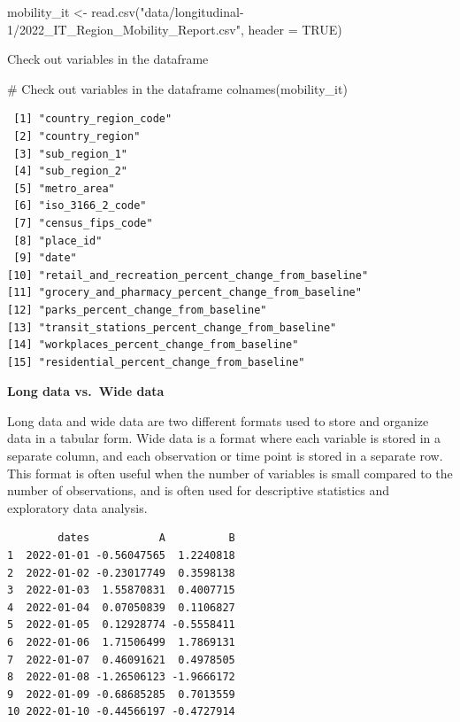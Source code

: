 \documentclass[
  letterpaper,
  DIV=11,
  numbers=noendperiod]{scrreprt}
\newenvironment{Shaded}{\begin{snugshade}}{\end{snugshade}}
\newcommand{\AttributeTok}[1]{\textcolor[rgb]{0.40,0.45,0.13}{#1}}
\newcommand{\CommentTok}[1]{\textcolor[rgb]{0.37,0.37,0.37}{#1}}
\newcommand{\ConstantTok}[1]{\textcolor[rgb]{0.56,0.35,0.01}{#1}}
\newcommand{\FunctionTok}[1]{\textcolor[rgb]{0.28,0.35,0.67}{#1}}
\newcommand{\NormalTok}[1]{\textcolor[rgb]{0.00,0.23,0.31}{#1}}
\newcommand{\OtherTok}[1]{\textcolor[rgb]{0.00,0.23,0.31}{#1}}
\newcommand{\StringTok}[1]{\textcolor[rgb]{0.13,0.47,0.30}{#1}}
\begin{document}
\begin{Shaded}
\begin{Highlighting}[]
\NormalTok{mobility\_it }\OtherTok{\textless{}{-}} \FunctionTok{read.csv}\NormalTok{(}\StringTok{"data/longitudinal{-}1/2022\_IT\_Region\_Mobility\_Report.csv"}\NormalTok{, }\AttributeTok{header =} \ConstantTok{TRUE}\NormalTok{)}
\end{Highlighting}
\end{Shaded}

Check out variables in the dataframe

\begin{Shaded}
\begin{Highlighting}[]
\CommentTok{\# Check out variables in the dataframe }
\FunctionTok{colnames}\NormalTok{(mobility\_it)}
\end{Highlighting}
\end{Shaded}

\begin{verbatim}
 [1] "country_region_code"                               
 [2] "country_region"                                    
 [3] "sub_region_1"                                      
 [4] "sub_region_2"                                      
 [5] "metro_area"                                        
 [6] "iso_3166_2_code"                                   
 [7] "census_fips_code"                                  
 [8] "place_id"                                          
 [9] "date"                                              
[10] "retail_and_recreation_percent_change_from_baseline"
[11] "grocery_and_pharmacy_percent_change_from_baseline" 
[12] "parks_percent_change_from_baseline"                
[13] "transit_stations_percent_change_from_baseline"     
[14] "workplaces_percent_change_from_baseline"           
[15] "residential_percent_change_from_baseline"          
\end{verbatim}

\textbf{Long data vs.~Wide data}

Long data and wide data are two different formats used to store and
organize data in a tabular form. Wide data is a format where each
variable is stored in a separate column, and each observation or time
point is stored in a separate row. This format is often useful when the
number of variables is small compared to the number of observations, and
is often used for descriptive statistics and exploratory data analysis.

\begin{verbatim}
        dates           A          B
1  2022-01-01 -0.56047565  1.2240818
2  2022-01-02 -0.23017749  0.3598138
3  2022-01-03  1.55870831  0.4007715
4  2022-01-04  0.07050839  0.1106827
5  2022-01-05  0.12928774 -0.5558411
6  2022-01-06  1.71506499  1.7869131
7  2022-01-07  0.46091621  0.4978505
8  2022-01-08 -1.26506123 -1.9666172
9  2022-01-09 -0.68685285  0.7013559
10 2022-01-10 -0.44566197 -0.4727914
\end{verbatim}
\end{document}
